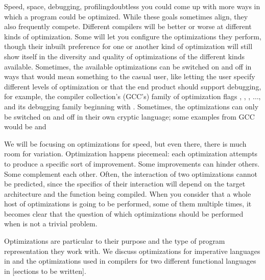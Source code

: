 Speed, space, debugging, profiling\empause doubtless you could come up with more ways in which a program could be optimized. While these goals sometimes align, they also frequently compete. Different compilers will be better or worse at different kinds of optimization. Some will let you configure the optimizations they perform, though their inbuilt preference for one or another kind of optimization will still show itself in the diversity and quality of optimizations of the different kinds available. Sometimes, the available optimizations can be switched on and off in ways that would mean something to the casual user, like letting the user specify different levels of optimization or that the end product should support debugging, for example, the  compiler collection's (GCC's) family of optimization flags , , , $\dotsc$,  and its debugging family beginning with . Sometimes, the optimizations can only be switched on and off in their own cryptic language; some examples from GCC would be  and 

We will be focusing on optimizations for speed, but even there, there is much room for variation. Optimization happens piecemeal: each optimization attempts to produce a specific sort of improvement. Some improvements can hinder others. Some complement each other. Often, the interaction of two optimizations cannot be predicted, since the specifics of their interaction will depend on the target architecture and the function being compiled. When you consider that a whole host of optimizations is going to be performed, some of them multiple times, it becomes clear that the question of which optimizations should be performed when is not a trivial problem.%

Optimizations are particular to their purpose and the type of program representation they work with. We discuss optimizations for imperative languages in  and the optimizations used in compilers for two different functional languages in [sections to be written].%
